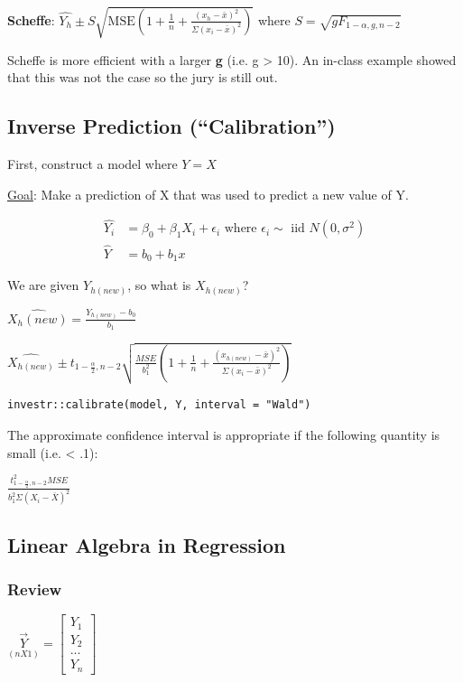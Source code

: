 \documentclass[11pt]{article}
\begin{document}
\textbf{Scheffe}: \(\hat{Y_h} \pm S \sqrt{\text{MSE}(1 + \frac{1}{n} +\frac{(x_h -
 \bar{x})^2}{\Sigma(x_i - \bar{x})^2})}\) where \(S = \sqrt{g F_{1 - \alpha,g,n-2}}\)

Scheffe is more efficient with a larger \textbf{g} (i.e. g > 10). An in-class example
showed that this was not the case so the jury is still out.
\subsection{Inverse Prediction (``Calibration'')}
\label{sec:org294d8c2}

First, construct a model where \(Y = X\)

\uline{Goal}: Make a prediction of X that was used to predict a new value of Y.

\begin{equation}
\begin{split}
\hat{Y_i} & = \beta_0 + \beta_1 X_i + \epsilon_i \text{ where } \epsilon_i \sim \text{ iid } N(0, \sigma^2)\\
\hat{Y} & = b_0 + b_1 x
\end{split}
\end{equation}

We are given \(Y_{h(new)}\), so what is \(X_{h(new)}\)?

\(\hat{X_h(new)} = \frac{Y_{h(new)} - b_0}{b_1}\)

\(\hat{X_{h(new)}} \pm t_{1 - \frac{\alpha}{2},n-2} \sqrt{\frac{MSE}{b_1^2} (1 + \frac{1}{n} +\frac{(x_{h(new)} - \bar{x})^2}{\Sigma(x_i - \bar{x})^2})}\)

\begin{verbatim}
investr::calibrate(model, Y, interval = "Wald")
\end{verbatim}

The approximate confidence interval is appropriate if the following quantity is
small (i.e. < .1):

\(\frac{t_{1 - \frac{\alpha}{2}, n - 2}^2 MSE}{b_1^2 \Sigma (X_i - \bar{X})^2}\)

\subsection{Linear Algebra in Regression}
\label{sec:org4e98a85}
\subsubsection{Review}
\label{sec:org9742f01}

\(\underset{(n X 1)}{\vec{Y}} =
\begin{bmatrix}
Y_1\\
Y_2\\
...\\
Y_n
\end{bmatrix}\)
\end{document}
